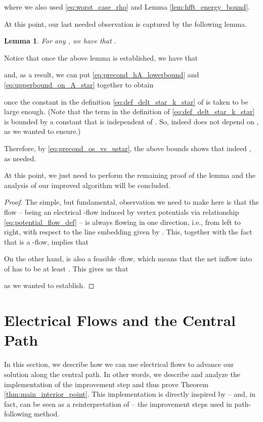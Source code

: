 \documentclass[11pt, letterpaper]{article}
\newtheorem{lemma}[theorem]{Lemma}
\begin{document}
where we also used \eqref{eq:worst_case_rho} and Lemma \ref{lem:hfft_energy_bound}.

At this point, our last needed observation is captured by the following lemma.
\begin{lemma}
\label{lem:Astar_vs_Ahat}
For any , we have that .
\end{lemma} 

Notice that once the above lemma is established, we have that 

and, as a result, we can put \eqref{eq:precond_hA_lowerbound} and \eqref{eq:upperbound_on_A_star} together to obtain

once the constant  in the definition \eqref{eq:def_delt_star_k_star} of  is taken to be large enough. (Note that the term  in the definition of  \eqref{eq:def_delt_star_k_star} is bounded by a constant that is independent of . So, indeed  does not depend on , as we wanted to ensure.)

Therefore, by \eqref{eq:precond_os_vs_ustar}, the above bounds shows that indeed , as needed. 

At this point, we just need to perform the remaining proof of the lemma and the analysis of our improved algorithm will be concluded.

\begin{proof}
The simple, but fundamental, observation we need to make here is that the flow  -- being an electrical -flow induced by vertex potentials  via relationship \eqref{eq:potential_flow_def} -- is always flowing in one direction, i.e., from left to right, with respect to the line embedding given by .  This, together with the fact that  is a -flow, implies that


On the other hand,  is also a feasible -flow, which means that the net inflow into  of  has to be at least . This gives us that

as we wanted to establish.
\end{proof}

 \section{Electrical Flows and the Central Path}\label{sec:proof_main_interior_point}

In this section, we describe how we can use electrical flows to advance our solution along the central path. In other words, we describe and analyze the implementation of the improvement step and thus prove Theorem \ref{thm:main_interior_point}. This implementation is directly inspired by -- and, in fact, can be seen as a reinterpretation of -- the improvement steps used in path-following method. 
\end{document}
